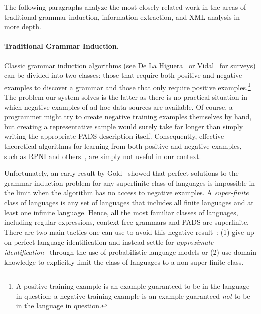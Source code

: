 \noindent
The following paragraphs analyze
the most closely related work in the areas of
traditional grammar induction, information extraction, and XML analysis
in more depth.

\paragraph*{Traditional Grammar Induction.}
Classic grammar induction algorithms (see De La Higuera~\cite{higuera01current}
or Vidal~\cite{vidal:gisurvey} for surveys) can be divided into two classes:
those that require both positive and negative examples to discover a grammar
and those that only require positive examples.\footnote{A positive training
example is an example guaranteed to be in the language in question;
a negative training example is an example guaranteed {\em not} to be in the 
language in question.}  The problem our system solves is the latter as
there is no practical situation in which negative examples of ad hoc 
data sources are available.  Of course, a programmer might try to create
negative training examples themselves by hand, but creating a representative
sample would surely take far longer than simply writing
the appropriate PADS description itself.  Consequently, effective theoretical
algorithms for learning from both positive and negative examples, such as
RPNI and others~\cite{rpni,fill-in-more-references}, are simply not useful 
in our context.  

Unfortunately, an early result by Gold~\cite{gold:inference} 
showed that perfect solutions to the 
grammar induction problem for any superfinite class of languages is 
impossible in the limit when the algorithm has no access to negative 
examples.  A {\em super-finite} class of languages is any set of languages
that includes all finite languages and at least one infinite language. Hence,
all the most familiar classes of languages, including regular expressions, 
context free grammars and PADS are superfinite.  There are two
main tactics one can use to avoid this negative result~\cite{vidal:gisurvey}:
(1) give up on perfect language identification and instead
settle for 
{\em approximate identification}~\cite{wharton:approximate-language-identification} through the use of probabilistic language
models or (2) use domain knowledge to explicitly limit the class of languages
to a non-super-finite class.  

